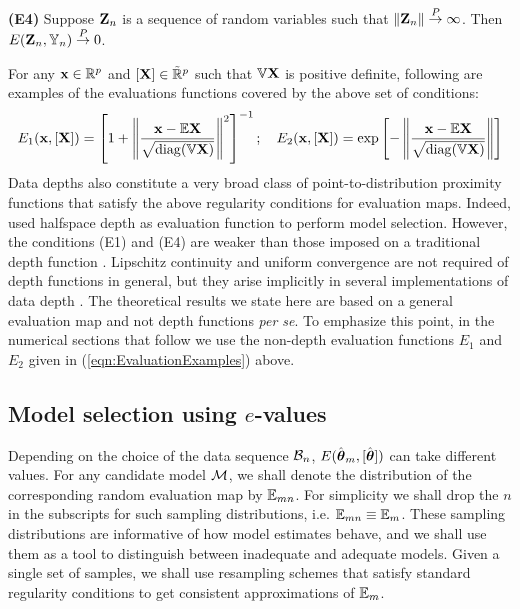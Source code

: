 \noindent\textbf{(E4)}
Suppose ${\mathbf{Z}}_n$ is a sequence of random variables such that $\| {\mathbf{Z}}_n \| \stackrel{P}{\rightarrow} \infty$. Then $E( {\mathbf{Z}}_n, {\mathbb{Y}}_n) \stackrel{P}{\rightarrow} 0$.
\vspace{1em}

For any ${\bf{x}} \in {\mathbb{R}}^p$ and $[ {\mathbf{X}} ] \in \tilde {{\mathbb{R}}}^p$ such that ${\mathbb{V}} {\mathbf{X}}$ is positive definite, following are examples of the evaluations functions covered by the above set of conditions:
%
\begin{align}\label{eqn:EvaluationExamples}
E_1 ({\bf{x}}, [ {\mathbf{X}}]) = \left[ 1 + \left\| \frac{{\bf{x}} - {\mathbb{E}} {\mathbf{X}} }{ \sqrt { \operatorname*{diag}  ({\mathbb{V}} {\mathbf{X}}) }}  \right\|^2 \right]^{-1}; \quad
E_2 ({\bf{x}}, [ {\mathbf{X}}]) = \exp \left[ - \left\| \frac{{\bf{x}} - {\mathbb{E}} {\mathbf{X}} }{ \sqrt { \operatorname*{diag}  ({\mathbb{V}} {\mathbf{X}}) }}  \right\| \right]
\end{align}
%
Data depths \citep{tukey75, zuo00, zuo03} also constitute a very broad class of point-to-distribution proximity functions that satisfy the above regularity conditions for evaluation maps. Indeed, \cite{MajumdarChatterjee17} used halfspace depth \citep{tukey75} as evaluation function to perform model selection. However, the conditions (E1) and (E4) are weaker than those imposed on a traditional depth function \citep{zuo00}. Lipschitz continuity and uniform convergence are not required of depth functions in general, but they arise implicitly in several implementations of data depth \citep{MoslerChapter13}. The theoretical results we state here are based on a general evaluation map and not depth functions \textit{per se}. To emphasize this point, in the numerical sections that follow we use the non-depth evaluation functions $E_1$ and $E_2$ given in (\ref{eqn:EvaluationExamples}) above.


\subsection{Model selection using $e$-values}
Depending on the choice of the data sequence ${\cal{B}}_n$, $E( \hat {{\boldsymbol{\theta}}}_m, [\hat {{\boldsymbol{\theta}}}])$ can take different values. For any candidate model ${\cal{M}}$, we shall denote the distribution of the corresponding random evaluation map by ${\mathbb{E}}_{m n}$. For simplicity we shall drop the $n$ in the subscripts for such sampling distributions, i.e. ${\mathbb{E}}_{m n} \equiv {\mathbb{E}}_m$. These sampling distributions are informative of how model estimates behave, and we shall use them as a tool to distinguish between inadequate and adequate models. Given a single set of samples, we shall use resampling schemes that satisfy standard regularity conditions \citep{MajumdarChatterjee17} to get consistent approximations of ${\mathbb{E}}_{m}$.

